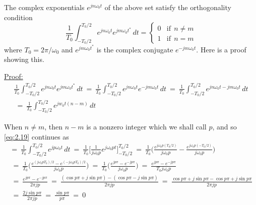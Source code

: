 \documentclass[10pt]{article}
\begin{document}
\vspace{2mm}

\noindent
The complex exponentials $e^{jn\omega_0t}$ of the above set satisfy the orthogonality condition
\[ \frac{1}{T_0}\int_{-T_0/2}^{T_0/2} e^{jn\omega_0t} e^{jm\omega_0t^{\ast}} \,dt = \begin{cases} 0 & \text{if} \:\: n \neq m \\ 1 & \text{if} \:\: n = m \end{cases}\] where $T_0 = 2\pi / \omega_0$ and $e^{jm\omega_0t^{\ast}}$ is the complex conjugate $e^{-jm\omega_0t}$. Here is a proof showing this.

\hspace{1cm}

\noindent
\underline{Proof:}
\begin{equation}   \label{eq:2.19}
\begin{aligned}
    \frac{1}{T_0}\int_{-T_0/2}^{T_0/2} e^{jn\omega_0t} e^{jm\omega_0t^{\ast}} \,dt \: = \:
    \frac{1}{T_0}\int_{-T_0/2}^{T_0/2} e^{jn\omega_0t} e^{-jm\omega_0t} \,dt \: = \:
    \frac{1}{T_0}\int_{-T_0/2}^{T_0/2} e^{jn\omega_0t-jm\omega_0t} \,dt \\
    \: = \: \frac{1}{T_0}\int_{-T_0/2}^{T_0/2} e^{jw_0t(n-m)} \,dt
\end{aligned}
\end{equation}

\noindent
When $n \neq m$, then $n - m$ is a nonzero integer which we shall call $p$, and so \eqref{eq:2.19} continues as
\begin{equation} \label{eq:2.20}
\begin{aligned}
    = \: 
    \frac{1}{T_0}\int_{-T_0/2}^{T_0/2} e^{jp\omega_0t} \,dt \: = \:
    \frac{1}{T_0}\Big[\frac{1}{j\omega_0p} e^{j\omega_0pt}\Big]_{-T_0/2}^{T_0/2} \: = \:
    \frac{1}{T_0}\Big(\frac{e^{j\omega_0p(T_0/2)}}{j\omega_0p} - \frac{e^{j\omega_0p(-T_0/2)}}{j\omega_0p}\Big) \\
    \: = \: \frac{1}{T_0}\Big(\frac{e^{(j\omega_0pT_0)/2}-e^{(-j\omega_0pT_0)/2}}{j\omega_0p}\Big) \: = \: \frac{1}{T_0}\Big(\frac{e^{jp\pi}-e^{-jp\pi}}{j\omega_0p}\Big) \: = \: \frac{e^{jp\pi}-e^{-jp\pi}}{T_0j\omega_0p} \\
    \: = \: \frac{e^{jp\pi}-e^{-jp\pi}}{2\pi j p} \: = \: \frac{(\cos{p\pi}+j\sin{p\pi}) - (\cos{p\pi}-j\sin{p\pi})}{2 \pi j p} \: = \: \frac{\cos{p\pi}+j\sin{p\pi}-\cos{p\pi}+j\sin{p\pi}}{2 \pi j p} \\
    \: = \: \frac{2j\sin{p\pi}}{2\pi j p} \: = \: \frac{\sin{p\pi}}{p\pi} \: = \: 0
\end{aligned}
\end{equation}
\end{document}
